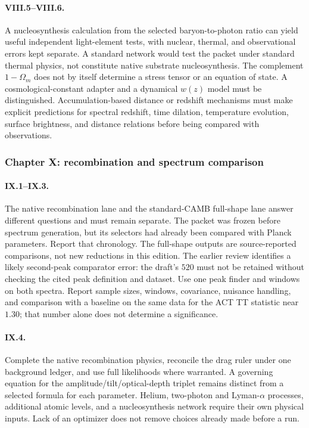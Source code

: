 \paragraph{VIII.5--VIII.6.}
A nucleosynthesis calculation from the selected baryon-to-photon ratio can yield useful independent light-element tests, with nuclear, thermal, and observational errors kept separate. A standard network would test the packet under standard thermal physics, not constitute native substrate nucleosynthesis. The complement $1-\Omega_m$ does not by itself determine a stress tensor or an equation of state. A cosmological-constant adapter and a dynamical $w(z)$ model must be distinguished. Accumulation-based distance or redshift mechanisms must make explicit predictions for spectral redshift, time dilation, temperature evolution, surface brightness, and distance relations before being compared with observations.

\subsubsection*{Chapter X: recombination and spectrum comparison}

\paragraph{IX.1--IX.3.}
The native recombination lane and the standard-CAMB full-shape lane answer different questions and must remain separate. The packet was frozen before spectrum generation, but its selectors had already been compared with Planck parameters. Report that chronology. The full-shape outputs are source-reported comparisons, not new reductions in this edition. The earlier review identifies a likely second-peak comparator error: the draft's $520$ must not be retained without checking the cited peak definition and dataset. Use one peak finder and windows on both spectra. Report sample sizes, windows, covariance, nuisance handling, and comparison with a baseline on the same data for the ACT TT statistic near $1.30$; that number alone does not determine a significance.

\paragraph{IX.4.}
Complete the native recombination physics, reconcile the drag ruler under one background ledger, and use full likelihoods where warranted. A governing equation for the amplitude/tilt/optical-depth triplet remains distinct from a selected formula for each parameter. Helium, two-photon and Lyman-$\alpha$ processes, additional atomic levels, and a nucleosynthesis network require their own physical inputs. Lack of an optimizer does not remove choices already made before a run.

